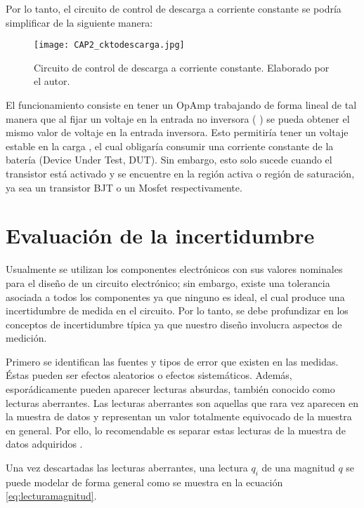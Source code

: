 Por lo tanto, el circuito de control de descarga a corriente constante se podría simplificar de la siguiente manera: 

\begin{figure}[!ht]
\begin{center}
\texttt{[image: CAP2\_cktodescarga.jpg]}
\caption{Circuito de control de descarga a corriente constante. Elaborado por el autor.}
\label{fig:cktodescarga}
\end{center}
\end{figure}

El funcionamiento consiste en tener un OpAmp trabajando de forma lineal de tal manera que al fijar un voltaje en la entrada no inversora ( ) se pueda obtener el mismo valor de voltaje en la entrada inversora. Esto permitiría tener un voltaje estable en la carga  , el cual obligaría consumir una corriente constante de la batería (Device Under Test, DUT). Sin embargo, esto solo sucede cuando el transistor está activado y se encuentre en la región activa o región de saturación, ya sea un transistor BJT o un Mosfet respectivamente.

\section{Evaluación de la incertidumbre}

Usualmente se utilizan los componentes electrónicos con sus valores nominales para el diseño de un circuito electrónico; sin embargo, existe una tolerancia asociada a todos los componentes ya que ninguno es ideal, el cual produce una incertidumbre de medida en el circuito. Por lo tanto, se debe profundizar en los conceptos de incertidumbre típica ya que nuestro diseño involucra aspectos de medición.

Primero se identifican las fuentes y tipos de error que existen en las medidas. Éstas pueden ser efectos aleatorios o efectos sistemáticos. Además, esporádicamente pueden aparecer lecturas absurdas, también conocido como lecturas aberrantes. Las lecturas aberrantes son aquellas que rara vez aparecen en la muestra de datos y representan un valor totalmente equivocado de la muestra en general. Por ello, lo recomendable es separar estas lecturas de la muestra de datos adquiridos \cite{Angel2006}.

Una vez descartadas las lecturas aberrantes, una lectura $q_i$ de una magnitud $q$  se puede modelar de forma general como se muestra en la ecuación \ref{eq:lecturamagnitud}.

